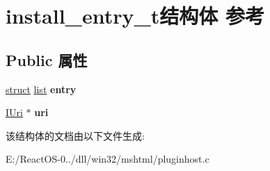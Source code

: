 \hypertarget{structinstall__entry__t}{}\section{install\+\_\+entry\+\_\+t结构体 参考}
\label{structinstall__entry__t}
\subsection*{Public 属性}
\begin{DoxyCompactItemize}
\item 
\mbox{\label{structinstall__entry__t_a791c00c7683c6b5999bd30e1eb5c0d4e}} 
\hyperlink{interfacestruct}{struct} \hyperlink{classlist}{list} {\bfseries entry}
\item 
\mbox{\label{structinstall__entry__t_a190a0d13a31a349dcbcdd5b29327a5cd}} 
\hyperlink{interface_i_uri}{I\+Uri} $\ast$ {\bfseries uri}
\end{DoxyCompactItemize}


该结构体的文档由以下文件生成\+:\begin{DoxyCompactItemize}
\item 
E\+:/\+React\+O\+S-\/0../dll/win32/mshtml/pluginhost.\+c\end{DoxyCompactItemize}
